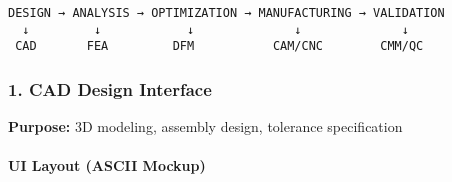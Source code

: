 \documentclass[
]{article}
\begin{document}
\begin{verbatim}
DESIGN → ANALYSIS → OPTIMIZATION → MANUFACTURING → VALIDATION
  ↓         ↓            ↓              ↓              ↓
 CAD       FEA         DFM           CAM/CNC        CMM/QC
\end{verbatim}

\hypertarget{cad-design-interface}{%
\subsubsection{1. CAD Design Interface}\label{cad-design-interface}}

\textbf{Purpose:} 3D modeling, assembly design, tolerance specification

\hypertarget{ui-layout-ascii-mockup}{%
\paragraph{UI Layout (ASCII Mockup)}\label{ui-layout-ascii-mockup}}
\end{document}
